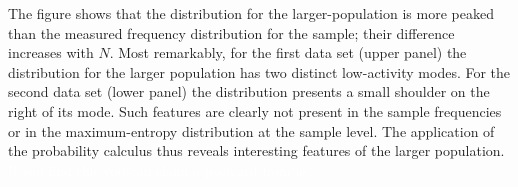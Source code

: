 \documentclass[\ifafour a4paper,12pt,\else a5paper,10pt,\fi%
onecolumn,oneside,article,%
british%
]{memoir}
\theoremstyle{remark}
\theoremstyle{innote}
\renewcommand*{\|}{\nonscript\,\vert\nonscript\;\mathopen{}}
\begin{document}
The figure shows that the distribution for the larger-population is more
peaked than the measured frequency distribution for the sample; their
difference increases with $N$. Most remarkably, for the first data set
(upper panel) the distribution for the larger population has two distinct
low-activity modes. For the second data set (lower panel) the distribution
presents a small shoulder on the right of its mode.
Such features are clearly not present in the sample frequencies or in the
maximum-entropy distribution at the sample level. The application of the
probability calculus thus reveals interesting features of the larger
population. \textcolor{white}{If you find this you can claim a postcard
  from us.}
\end{document}
